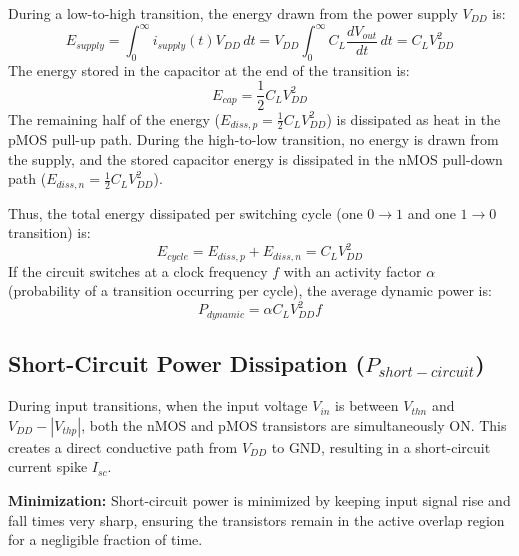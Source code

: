 \documentclass[12pt,a4paper]{article}
\begin{document}
\begin{tcolorbox}[formulabox, title={\textbf{Dynamic Power Derivation}}]
During a low-to-high transition, the energy drawn from the power supply $V_{DD}$ is:
\begin{equation}
  E_{supply} = \int_{0}^{\infty} i_{supply}(t) V_{DD} \, d t = V_{DD} \int_{0}^{\infty} C_L \frac{d V_{out}}{d t} \, d t = C_L V_{DD}^2
\end{equation}
The energy stored in the capacitor at the end of the transition is:
\begin{equation}
  E_{cap} = \frac{1}{2} C_L V_{DD}^2
\end{equation}
The remaining half of the energy ($E_{diss, p} = \frac{1}{2} C_L V_{DD}^2$) is dissipated as heat in the pMOS pull-up path. During the high-to-low transition, no energy is drawn from the supply, and the stored capacitor energy is dissipated in the nMOS pull-down path ($E_{diss, n} = \frac{1}{2} C_L V_{DD}^2$).

Thus, the total energy dissipated per switching cycle (one $0 \to 1$ and one $1 \to 0$ transition) is:
\begin{equation}
  E_{cycle} = E_{diss, p} + E_{diss, n} = C_L V_{DD}^2
\end{equation}
If the circuit switches at a clock frequency $f$ with an activity factor $\alpha$ (probability of a transition occurring per cycle), the average dynamic power is:
\begin{equation}
  P_{dynamic} = \alpha C_L V_{DD}^2 f
\end{equation}
\end{tcolorbox}

\subsection{Short-Circuit Power Dissipation (\texorpdfstring{$P_{short-circuit}$}{P\_short-circuit})}
During input transitions, when the input voltage $V_{in}$ is between $V_{thn}$ and $V_{DD} - |V_{thp}|$, both the nMOS and pMOS transistors are simultaneously ON. This creates a direct conductive path from $V_{DD}$ to GND, resulting in a short-circuit current spike $I_{sc}$.

\textbf{Minimization:} Short-circuit power is minimized by keeping input signal rise and fall times very sharp, ensuring the transistors remain in the active overlap region for a negligible fraction of time.
\end{document}
